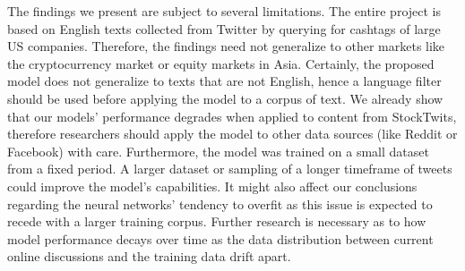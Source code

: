 The findings we present are subject to several limitations. The entire project is based on English texts collected from Twitter by querying for cashtags of large US companies. Therefore, the findings need not generalize to other markets like the cryptocurrency market or equity markets in Asia. Certainly, the proposed model does not generalize to texts that are not English, hence a language filter should be used before applying the model to a corpus of text. We already show that our models' performance degrades when applied to content from StockTwits, therefore researchers should apply the model to other data sources (like Reddit or Facebook) with care. Furthermore, the model was trained on a small dataset from a fixed period. A larger dataset or sampling of a longer timeframe of tweets could improve the model's capabilities. It might also affect our conclusions regarding the neural networks' tendency to overfit as this issue is expected to recede with a larger training corpus. Further research is necessary as to how model performance decays over time as the data distribution between current online discussions and the training data drift apart.

